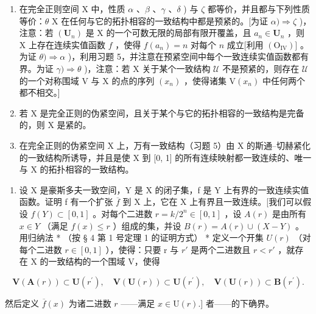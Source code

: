 \begin{enumerate}
\def\labelenumi{\alph{enumi})}
\setcounter{enumi}{3}
\item
  在完全正则空间 X 中，性质 \(\alpha\) 、\(\beta\) 、\(\gamma\) 、\(\delta\) ) 与 \(\zeta\) 都等价，并且都与下列性质等价：\(\theta\) X 在任何与它的拓扑相容的一致结构中都是预紧的。{[}为证 \(\alpha) \Longrightarrow \zeta\) )，注意：若 \((\mathbf{U}_n)\) 是 X 的一个可数无限的局部有限开覆盖，且 \(a_n \in \mathbf{U}_n\) ，则 X 上存在连续实值函数 \(f\) ，使得 \(f(a_n) = n\) 对每个 \(n\) 成立{[}利用 \((\mathrm{O}_{\mathrm{IV}})]\) 。为证 \(\theta) \Longrightarrow \alpha\) )，利用习题 5，并注意在预紧空间中每个一致连续实值函数都有界。为证 \(\gamma) \Longrightarrow \theta\) )，注意：若 X 关于某个一致结构 \(\mathcal{U}\) 不是预紧的，则存在 \(\mathcal{U}\) 的一个对称围域 V 与 X 的点的序列 \((x_n)\) ，使得诸集 \(\mathrm{V}(x_n)\) 中任何两个都不相交。{]}
\item
  若 X 是完全正则的伪紧空间，且关于某个与它的拓扑相容的一致结构是完备的，则 X 是紧的。
\item
  在完全正则的伪紧空间 X 上，万有一致结构（习题 5）由 X 的斯通–切赫紧化的一致结构所诱导，并且是使 X 到 {[}0, 1{]} 的所有连续映射都一致连续的、唯一与 X 的拓扑相容的一致结构。
\end{enumerate}

\begin{enumerate}
\def\labelenumi{\arabic{enumi})}
\setcounter{enumi}{21}
\tightlist
\item
  设 X 是豪斯多夫一致空间，Y 是 X 的闭子集，f 是 Y 上有界的一致连续实值函数。证明 f 有一个扩张 \(\overline{f}\) 到 X 上，它在 X 上有界且一致连续。{[}我们可以假设 \(f(Y) \subset [0, 1]\) 。对每个二进数 \(r = k/2^{n} \in [0, 1]\) ，设 \(A(r)\) 是由所有 \(x \in Y\) （满足 \(f(x) \leqslant r\) ）组成的集，并设 \(B(r) = A(r) \cup (X - Y)\) 。用归纳法 * （按 § 4 第 1 号定理 1 的证明方式） * 定义一个开集 \(U(r)\) （对每个二进数 \(r \in [0, 1]\) ），使得：只要 r 与 \(r'\) 是两个二进数且 \(r < r'\) ，就存在 X 的一致结构的一个围域 V，使得
\end{enumerate}

\[
\mathbf {V} (\mathbf {A} (r)) \subset \mathbf {U} (r ^ {\prime}), \quad \mathbf {V} (\mathbf {U} (r)) \subset \mathbf {U} (r ^ {\prime}), \quad \mathbf {V} (\mathbf {U} (r)) \subset \mathbf {B} (r ^ {\prime}).
\]

然后定义 \(\overline{f}(x)\) 为诸二进数 \(r\) ——满足 \(x \in \mathrm{U}(r).]\) 者——的下确界。

\ExerciseSection

